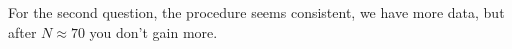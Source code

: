 \documentclass[letterpaper, 10 pt, conference]{ieeeconf}  %
\begin{document}
 For the second question, the procedure seems consistent, we have more data, but after $N \approx 70$ you don't gain more.
 









\end{document}
